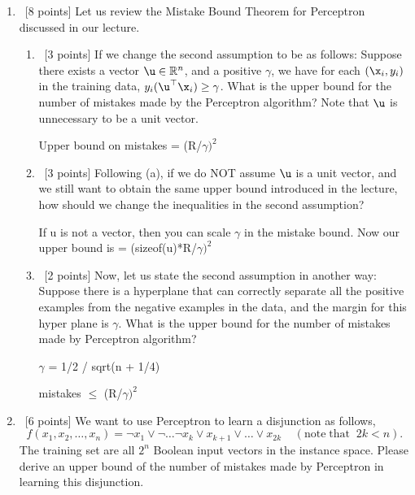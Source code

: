 \documentclass[12pt, fullpage,letterpaper]{article}
\begin{document}
\begin{enumerate}
\begin{enumerate}
		\end{enumerate}
	
	\item ~[8 points] Let us review the Mistake Bound Theorem for Perceptron discussed in our lecture. 
	\begin{enumerate}
		\item~[3 points] If we change the second assumption to be as follows: Suppose there exists a vector $\u\in \mathbb{R}^n$, and a positive $\gamma$, we have for each $(\x_i, y_i)$ in the training data, $y_i(\u^\top \x_i) \ge \gamma$. What is the upper bound for the number of mistakes made by the Perceptron algorithm?   Note that $\u$ is unnecessary to be a unit vector. \newline

Upper bound on mistakes = (R/$\gamma)^2$

		\item~[3 points] Following (a), if we do NOT assume $\u$ is a unit vector, and we still want to obtain the same upper bound introduced in the lecture, how should we change the inequalities in the second assumption? \newline

If u is not a vector, then you can scale $\gamma$ in the mistake bound. Now our upper bound is   = (sizeof(u)*R/$\gamma)^2$


		\item~[2 points]  Now, let us state the second assumption in another way: Suppose there is a hyperplane that can correctly separate all the positive examples from the negative examples in the data, and the margin for this hyper plane is $\gamma$. What is the upper bound for the number of mistakes made by Perceptron algorithm? \newline

$\gamma$ = 1/2 / sqrt(n + 1/4)

mistakes $\leq$  (R/$\gamma)^2$


	\end{enumerate}
	
	\item~[6 points] We want to use Perceptron to learn a disjunction as follows,
	\[
	f(x_1, x_2, \ldots, x_n) = \neg x_1 \lor \neg \ldots \neg x_k \lor x_{k+1} \lor \ldots \lor x_{2k} \;\;\;\;(\mathrm{note\; that}\;\; 2k < n).
	\]
	The training set are all $2^n$ Boolean input vectors in the instance space. 
	Please derive an upper bound of the number of mistakes made by Perceptron in learning this disjunction. \newline
	

\end{enumerate}
\end{document}
